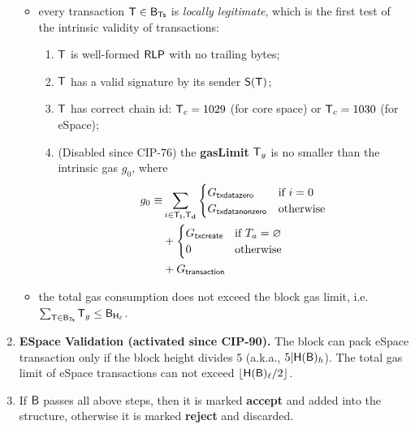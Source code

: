 \begin{enumerate}[]
\begin{itemize}[nosep]
	      	\item every transaction $\textsf{T}\in\textsf{B}_{\textsf{Ts}}$ is \emph{locally legitimate}, 
	      	      which is the first test of the intrinsic validity of transactions:
	      	      \begin{enumerate}[nosep]
	      	      	\item $\textsf{T}$ is well-formed $\mathsf{RLP}$ with no trailing bytes; 
	      	      	      
	      	      	\item $\textsf{T}$ has a valid signature by its sender $\mathsf{S}{\left({\textsf{T}} \right)}$;


	      	      	\item $\textsf{T}$ has correct chain id: $\textsf{T}_c = 1029$ (for core space) or $\textsf{T}_c=1030$ (for eSpace);
					
					\item (Disabled since CIP-76) the \textbf{gasLimit} $\textsf{T}_g$ is no smaller than the intrinsic gas $g_0$, where
					\begin{align}\label{def:g0}
						g_0\equiv 
						&\sum_{i\in \textsf{T}_{\bf i}, \textsf{T}_{\bf d}} \begin{cases}
							G_\mathsf{txdatazero} & \mbox{if $i=0$}\\
							G_\mathsf{txdatanonzero} & \mbox{otherwise}
						\end{cases}\notag\\
						&+ \begin{cases}
							G_\mathsf{txcreate} & \mbox{if $T_a=\varnothing$}\\
							0 & \mbox{otherwise}
						\end{cases}\notag\\
						&+ G_\mathsf{transaction}
					\end{align}
	      	      \end{enumerate}
	      	      
	      	\item the total gas consumption does not exceed the block gas limit, i.e. $\sum_{\textsf{T}\in \textsf{B}_{\textsf{Ts}}} \textsf{T}_g \le \textsf{B}_{\textsf{H}_{\ell}}$.
	      \end{itemize}
	      
	\item {\bf ESpace Validation (activated since CIP-90).} The block can pack eSpace transaction only if the block height divides 5 (a.k.a., $5|\textsf{H}(\textsf{B})_h$). The total gas limit of eSpace transactions can not exceed $\lfloor\textsf{H}(\textsf{B})_\ell/2\rfloor$.
	      
	\item If $\textsf{B}$ passes all above steps, then it is marked {\bf accept} and added into the \tg structure, otherwise it is marked {\bf reject} and discarded.
\end{enumerate}

